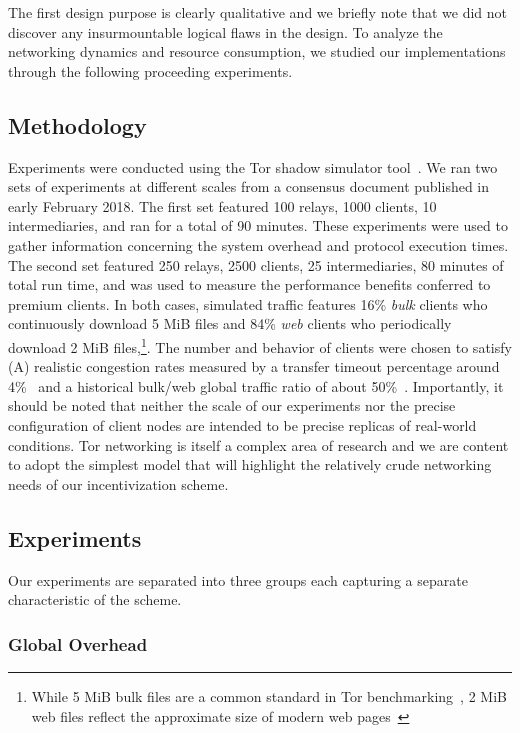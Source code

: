 The first design purpose is clearly qualitative and we briefly note that we did
not discover any insurmountable logical flaws in the design. To analyze the
networking dynamics and resource consumption, we studied our implementations
through the following proceeding experiments.

\subsection{Methodology}
\label{subsec:methodology}

Experiments were conducted using the Tor shadow simulator
tool~\cite{jansen2011shadow}. We ran two sets of experiments at different
scales from a consensus document published in early February 2018. The first set featured 100 relays, 1000 clients, 10 intermediaries, and
ran for a total of 90 minutes. These experiments were used to gather information
concerning the system overhead and protocol execution times. The second set
featured 250 relays, 2500 clients, 25 intermediaries, 80 minutes of total run
time, and was used to measure the performance benefits conferred to premium
clients. In both cases, simulated traffic features 16\% \emph{bulk} clients who
continuously download 5 MiB files and 84\% \emph{web} clients who periodically
download 2 MiB files,\footnote{While 5 MiB bulk files are a common standard in
  Tor benchmarking~\cite{portal2018tormetrics}, 2 MiB web files reflect the
  approximate size of modern web pages~\cite{team2018httparchive}}. The number
and behavior of clients were chosen to satisfy (A) realistic congestion rates
measured by a transfer timeout percentage around 4\%~\cite{portal2018tormetrics}
and a historical bulk/web global traffic ratio of about
50\%~\cite{chaabane2010digging, mccoy2008shining}. Importantly, it should be
noted that neither the scale of our experiments nor the precise configuration of
client nodes are intended to be precise replicas of real-world conditions. Tor
networking is itself a complex area of research and we are content to adopt the
simplest model that will highlight the relatively crude networking needs of our
incentivization scheme.

\subsection{Experiments}
\label{subsec:experiments}
Our experiments are separated into three groups each capturing a separate
characteristic of the scheme.

\subsubsection{Global Overhead}


